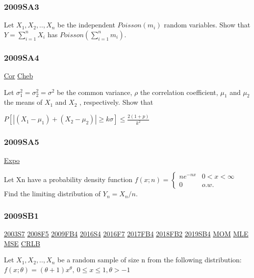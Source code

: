 \documentclass[10pt,twocolumn,portrait]{article}
\begin{document}
\hypertarget{sa3}{%
\subsubsection{2009SA3}\label{sa3}}

Let \(X_1,X_2,..,X_n\) be the independent \(Poisson(m_i)\) random
variables. Show that \(Y=\sum_{i=1}^n X_i\) has
\(Poisson(\sum_{i=1}^n m_i)\).

\hypertarget{sa4}{%
\subsubsection{2009SA4}\label{sa4}}

\protect\hyperlink{Cor}{Cor} \protect\hyperlink{section-1}{Cheb}

Let \(\sigma_1^2=\sigma_2^2=\sigma^2\) be the common variance, \(\rho\)
the correlation coefficient, \(\mu_1\) and \(\mu_2\) the means of
\(X_1\) and \(X_2\) , respectively. Show that

\(P[|(X_1-\mu_1)+(X_2-\mu_2)|\ge k\sigma]\le\frac{2(1+p)}{k^2}\)

\hypertarget{sa5}{%
\subsubsection{2009SA5}\label{sa5}}

\protect\hyperlink{Expo}{Expo}

Let Xn have a probability density function
\(f(x;n)=\begin{cases}ne^{-nx}& 0<x<\infty\\0& o.w.\end{cases}\) Find
the limiting distribution of \(Y_n=X_n/n\).

\hypertarget{sb1}{%
\subsubsection{2009SB1}\label{sb1}}

\protect\hyperlink{s7}{2003S7} \protect\hyperlink{f5-3}{2008F5}
\protect\hyperlink{fb4}{2009FB4} \protect\hyperlink{s4-4}{2016S4}
\protect\hyperlink{f7-5}{2016F7} \protect\hyperlink{fb4-3}{2017FB4}
\protect\hyperlink{fb2-4}{2018FB2} \protect\hyperlink{sb4-2}{2019SB4}
\protect\hyperlink{section-2}{MOM} \protect\hyperlink{MLE}{MLE}
\protect\hyperlink{section-4}{MSE} \protect\hyperlink{section-5}{CRLB}

Let \(X_1,X_2,..,X_n\) be a random sample of size n from the following
distribution: \(f(x;\theta)=(\theta+1)x^\theta,\ 0\le x\le 1,\theta>-1\)
\end{document}
